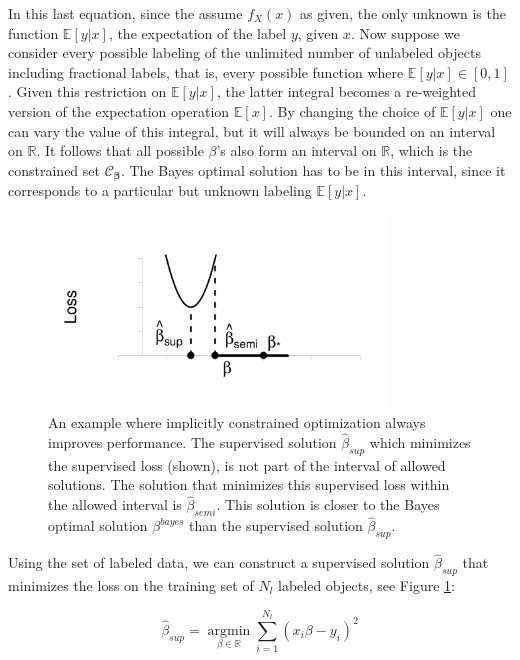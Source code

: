 \documentclass[smallcondensed]{svjour3}
\begin{document}
In this last equation, since the assume $f_X(x)$ as given, the only unknown is the function $\mathbb{E}[y|x]$, the expectation of the label $y$, given $x$. Now suppose we consider every possible labeling of the unlimited number of unlabeled objects including fractional labels, that is, every possible function where $\mathbb{E}[y|x] \in [0,1]$. Given this restriction on $\mathbb{E}[y|x]$, the latter integral becomes a re-weighted version of the expectation operation $\mathbb{E}[x]$. By changing the choice of $\mathbb{E}[y|x]$ one can vary the value of this integral, but it will always be bounded on an interval on $\mathbb{R}$. It follows that all possible $\beta$'s also form an interval on $\mathbb{R}$, which is the constrained set $\mathcal{C}_{\boldsymbol{\beta}}$. The Bayes optimal solution has to be in this interval, since it corresponds to a particular but unknown labeling $\mathbb{E}[y|x]$.

\begin{figure}[!ht] 
  \centering
      \includegraphics[width=0.8\textwidth]{ConstrainedProblem-1D.pdf}
  \caption{An example where implicitly constrained optimization always improves performance. The supervised solution $\hat{\beta}_{sup}$ which minimizes the supervised loss (shown), is not part of the interval of allowed solutions. The solution that minimizes this supervised loss within the allowed interval is $\hat{\beta}_{semi}$. This solution is closer to the Bayes optimal solution ${\beta}^{bayes}$ than the supervised solution $\hat{\beta}_{sup}$.} \label{fig:constrainedproblem}
\end{figure}

Using the set of labeled data, we can construct a supervised solution $\hat{\beta}_{sup}$ that minimizes the loss on the training set of $N_l$ labeled objects, see Figure \ref{fig:constrainedproblem}:

\begin{equation} \label{supervisedsolution}
\hat{\beta}_{sup} = \operatorname*{argmin}_{\beta \in \mathbb{R}} \sum_{i=1}^{N_l} (x_i \beta - y_i)^2
\end{equation}
\end{document}
